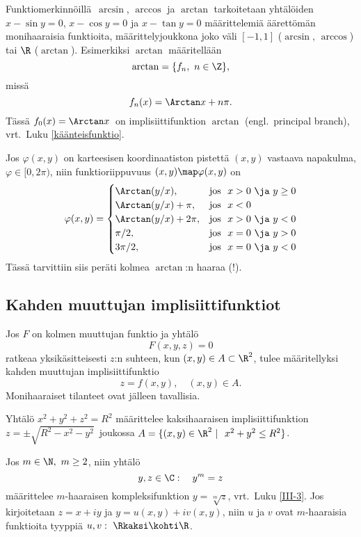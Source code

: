 Funktiomerkinnöillä $\,\arcsin$, $\arccos$ ja $\arctan$ tarkoitetaan yhtälöiden $x-\sin y =0$,
$x-\cos y=0$ ja $x-\tan y=0$ määrittelemiä äärettömän monihaaraisia funktioita,
määrittelyjoukkona joko väli $[-1,1]$ ($\arcsin,\,\arccos$) tai $\R$ ($\arctan$). Esimerkiksi
$\arctan$ määritellään
\[
\arctan = \{f_n, \ n\in\Z\},
\]
missä
\[
f_n(x)= \Arctan x + n\pi.
\]
Tässä $f_0(x)=\Arctan x\,$ on implisiittifunktion $\arctan$  
(engl.\ principal branch), vrt.\ Luku \ref{käänteisfunktio}.
\begin{Exa} \label{napakulman kaava} Jos $\varphi(x,y)$ on karteesisen koordinaatiston
pistettä $(x,y)$ vastaava napakulma, $\varphi\in[0,2\pi)$, niin funktioriippuvuus 
$(x,y)\map\varphi(x,y)$ on
\[
\varphi(x,y)=
\begin{cases}
\Arctan(y/x),      &\text{jos}\ \ x>0\ \ja\ y\geq 0 \\
\Arctan(y/x)+\pi,  &\text{jos}\ \ x<0 \\
\Arctan(y/x)+2\pi, &\text{jos}\ \ x>0\ \ja\ y<0 \\
\pi/2,             &\text{jos}\ \ x=0\ \ja\ y>0 \\
3\pi/2,            &\text{jos}\ \ x=0\ \ja\ y<0
\end{cases}
\]
Tässä tarvittiin siis peräti kolmea $\arctan$:n haaraa (!).
\loppu
\begin{figure}[H]
\begin{center}

\end{center}
\end{figure}
\end{Exa}

\subsection{Kahden muuttujan implisiittifunktiot}

Jos $F$ on kolmen muuttujan funktio ja yhtälö
\[
F(x,y,z)=0
\]
ratkeaa yksikäsitteisesti $z$:n suhteen, kun $(x,y)\in A\subset\R^2$, tulee määritellyksi
kahden muuttujan implisiittifunktio
\[
z=f(x,y), \quad (x,y)\in A.
\]
Monihaaraiset tilanteet ovat jälleen tavallisia.
\begin{Exa}
Yhtälö $x^2+y^2+z^2=R^2$ määrittelee kaksihaaraisen implisiittifunktion
$z=\pm\sqrt{R^2-x^2-y^2}\,$ joukossa $A=\{(x,y)\in\R^2 \ | \ x^2+y^2\leq R^2\}$. \loppu
\end{Exa}
\begin{Exa} Jos $m\in\N,\ m \ge 2$, niin yhtälö
\[
y,z\in\C: \quad y^m=z
\]
määrittelee $m$-haaraisen kompleksifunktion $y=\sqrt[m]{z}$, vrt.\ Luku \ref{III-3}.
Jos kirjoitetaan $z=x+iy$ ja $y=u(x,y)+iv(x,y)$, niin $u$ ja $v$ ovat $m$-haaraisia
funktioita tyyppiä $u,v:\ \Rkaksi\kohti\R$. \loppu
\end{Exa}

